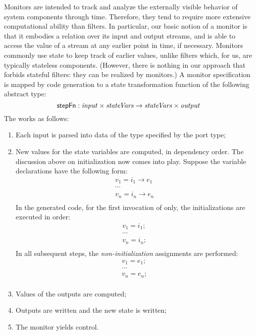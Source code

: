 Monitors are intended to track and analyze the externally visible
behavior of system components through time. Therefore, they tend to
require more extensive computational ability than filters. In
particular, our basic notion of a monitor is that it embodies a
relation over its input and output streams, and is able to access the
value of a stream at any earlier point in time, if necessary. Monitors
commonly use state to keep track of earlier values, unlike filters
which, for us, are typically stateless components. (However, there is
nothing in our approach that forbids stateful filters: they can be
realized by monitors.) A monitor specification is mapped by code
generation to a state transformation function of the following
abstract type:
%
\[
\mathsf{stepFn} : \mathit{input} \times \mathit{stateVars} \to \mathit{stateVars} \times \mathit{output}
\]
The  works as follows:
\begin{enumerate}

\item Each input is parsed into data of the type specified by the port
  type;

\item New values for the state variables are computed, in dependency
  order. The discussion above on initialization now comes into
  play. Suppose the variable declarations have the following form:
\[
\begin{array}{l}
  v_1 = i_1 \longrightarrow e_1 \\
  \cdots \\
  v_n = i_n \longrightarrow e_n \\
\end{array}
\]
In the generated code, for the first invocation of  only,
the initializations are executed in order:
\[
\begin{array}{l}
  v_1 = i_1; \\
  \cdots \\
  v_n = i_n; \\
\end{array}
\]
In all subsequent steps, the \emph{non-initialization} assignments are performed:
\[
\begin{array}{l}
  v_1 = e_1; \\
  \cdots \\
  v_n = e_n; \\
\end{array}
\]

\item Values of the outputs are computed;

\item Outputs are written and the new state is written;

\item The monitor yields control.
\end{enumerate}

